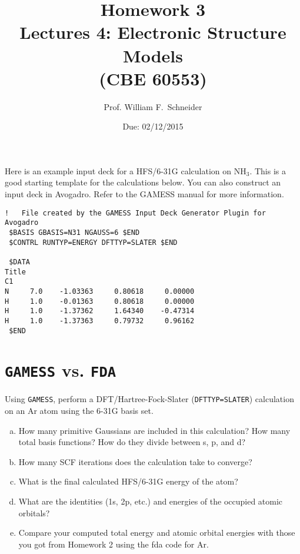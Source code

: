 \documentclass[11pt]{article}
\date{Due: 02/12/2015}
\title{}
\begin{document}
\title{Homework 3\\Lectures 4: Electronic Structure Models\\(CBE 60553)}
\author{Prof. William F.\ Schneider}
\maketitle


Here is an example input deck for a HFS/6-31G calculation on NH$_{\text{3}}$. This is a good starting template for the calculations below. You can also construct an input deck in Avogadro. Refer to the GAMESS manual for more information.

\begin{verbatim}
!   File created by the GAMESS Input Deck Generator Plugin for Avogadro
 $BASIS GBASIS=N31 NGAUSS=6 $END
 $CONTRL RUNTYP=ENERGY DFTTYP=SLATER $END

 $DATA 
Title
C1
N     7.0    -1.03363     0.80618     0.00000
H     1.0    -0.01363     0.80618     0.00000
H     1.0    -1.37362     1.64340    -0.47314
H     1.0    -1.37363     0.79732     0.96162
 $END
\end{verbatim}


\section{\texttt{GAMESS} vs. \texttt{FDA}}
\label{sec-1}

Using \texttt{GAMESS}, perform a DFT/Hartree-Fock-Slater (\verb~DFTTYP=SLATER~) calculation on an Ar atom using the 6-31G basis set.

\begin{enumerate}[(a)]
\item How many primitive Gaussians are included in this calculation? How many total basis functions? How do they divide between s, p, and d?

\item How many SCF iterations does the calculation take to converge?

\item What is the final calculated HFS/6-31G energy of the atom?

\item What are the identities (1s, 2p, etc.) and energies of the occupied atomic orbitals?

\item Compare your computed total energy and atomic orbital energies with those you got from Homework 2 using the fda code for Ar.
\end{enumerate}
\end{document}
